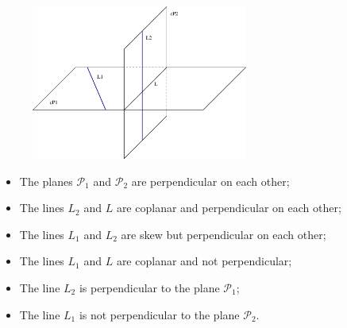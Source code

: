 \begin{frame}
%
\begin{figure}[h]
  \includegraphics[height=2in]{../../modules/coordinate-systems/pictures/perpendicularity.eps}
  \label{fig:perpendicularity}
\end{figure}
%
\begin{itemize}
%
\item The planes $\mathcal{P}_1$ and $\mathcal{P}_2$ are perpendicular on each other;
%
\item The lines $L_2$ and $L$ are coplanar and perpendicular on each other;
%
\item The lines $L_1$ and $L_2$ are skew but perpendicular on each other;
%
\item The lines $L_1$ and $L$ are coplanar and not perpendicular;
%
\item The line $L_2$ is perpendicular to the plane $\mathcal{P}_1$;
%
\item The line $L_1$ is not perpendicular to the plane $\mathcal{P}_2$.
\end{itemize}

\end{frame}